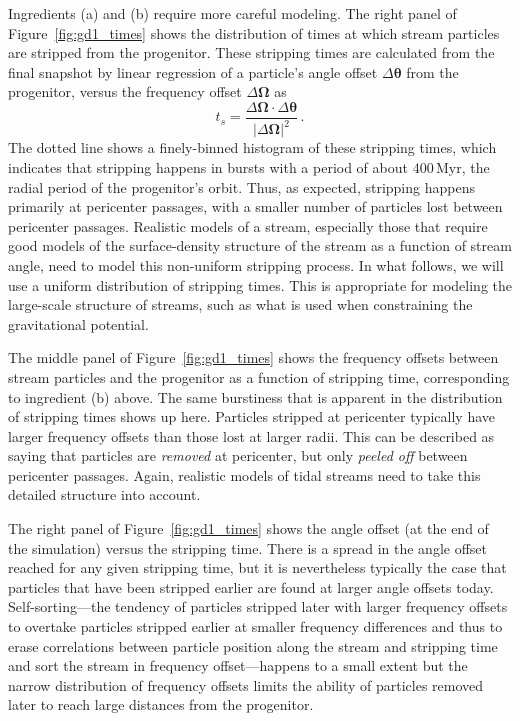 \documentclass[12pt,preprint]{aastex}
\renewcommand{\figurename}{Figure}
\renewcommand{\vec}[1]{\ensuremath{\mathbf{#1}}}
\newcommand{\veco}{\ensuremath{\vec{\Omega}}}
\newcommand{\veca}{\ensuremath{\boldsymbol\theta}}
\newcommand{\Myr}{\ensuremath{\,\mathrm{Myr}}}
\newcommand{\ts}{\ensuremath{t_s}}
\begin{document}
Ingredients (a) and (b) require more careful modeling. The right panel
of \figurename~\ref{fig:gd1_times} shows the distribution of times at
which stream particles are stripped from the progenitor. These
stripping times are calculated from the final snapshot by linear
regression of a particle's angle offset $\Delta \veca$ from the
progenitor, versus the frequency offset $\Delta \veco$ as 
\begin{equation}
  \ts = \frac{\Delta \veco \cdot \Delta \veca}{|\Delta \veco|^2}\,.
\end{equation}
The dotted line shows a finely-binned histogram of these stripping
times, which indicates that stripping happens in bursts with a period
of about $400\Myr$, the radial period of the progenitor's orbit. Thus,
as expected, stripping happens primarily at pericenter passages, with
a smaller number of particles lost between pericenter
passages. Realistic models of a stream, especially those that require
good models of the surface-density structure of the stream as a
function of stream angle, need to model this non-uniform stripping
process. In what follows, we will use a uniform distribution of
stripping times. This is appropriate for modeling the large-scale
structure of streams, such as what is used when constraining the
gravitational potential.

The middle panel of \figurename~\ref{fig:gd1_times} shows the
frequency offsets between stream particles and the progenitor as a
function of stripping time, corresponding to ingredient (b) above. The
same burstiness that is apparent in the distribution of stripping
times shows up here. Particles stripped at pericenter typically have
larger frequency offsets than those lost at larger radii. This can be
described as saying that particles are \emph{removed} at pericenter,
but only \emph{peeled off} between pericenter passages. Again,
realistic models of tidal streams need to take this detailed structure
into account.

The right panel of \figurename~\ref{fig:gd1_times} shows the angle
offset (at the end of the simulation) versus the stripping time. There
is a spread in the angle offset reached for any given stripping time,
but it is nevertheless typically the case that particles that have
been stripped earlier are found at larger angle offsets
today. Self-sorting---the tendency of particles stripped later with
larger frequency offsets to overtake particles stripped earlier at
smaller frequency differences and thus to erase correlations between
particle position along the stream and stripping time and sort the
stream in frequency offset---happens to a small extent but the narrow
distribution of frequency offsets limits the ability of particles
removed later to reach large distances from the progenitor.
\end{document}
